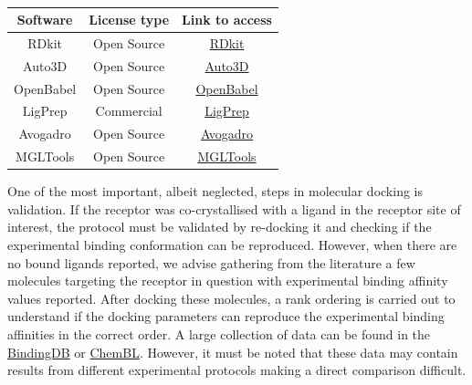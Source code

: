\documentclass[10pt, a4paper]{book}
\begin{document}
\begin{table}[ht]
    \centering
    \caption{{\color{red}{List of Tools for Ligand preparation and format conversion}}}
    \label{tab:list2}
    \begin{tabular}{|c|c|c|}
    \hline
         \textbf{Software} & \textbf{License type} & \textbf{Link to access} \\
    \hline
        RDkit & Open Source & \href{https://github.com/rdkit/rdkit}{RDkit} \\
        Auto3D & Open Source & \href{https://github.com/isayevlab/Auto3D_pkg}{Auto3D}  \\
        OpenBabel & Open Source & \href{https://github.com/openbabel/openbabel}{OpenBabel}  \\
        LigPrep & Commercial & \href{https://www.schrodinger.com/platform/products/ligprep/}{LigPrep} \\
        Avogadro & Open Source & \href{https://avogadro.cc/}{Avogadro}  \\
        MGLTools & Open Source & \href{https://ccsb.scripps.edu/mgltools/downloads/}{MGLTools} \\
    \hline
    \end{tabular}
\end{table}


One of the most important, albeit neglected, steps in molecular docking is validation. If the receptor was co-crystallised with a ligand in the receptor site of interest, the protocol must be validated by re-docking it and checking if the experimental binding conformation can be reproduced. However, when there are no bound ligands reported, we advise gathering from the literature a few molecules targeting the receptor in question with experimental binding affinity values reported. After docking these molecules, a rank ordering is carried out to understand if the docking parameters can reproduce the experimental binding affinities in the correct order. {} A large collection of data can be found in the \href{https://www.bindingdb.org/rwd/bind/index.jsp}{BindingDB} or  \href{https://www.ebi.ac.uk/chembl/}{ChemBL}. However, it must be noted that these data may contain results from different experimental protocols making a direct comparison difficult.
\end{document}
